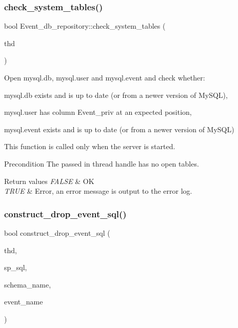 \subsubsection{\texorpdfstring{check\+\_\+system\+\_\+tables()}{check\_system\_tables()}}
{\footnotesize\ttfamily bool Event\+\_\+db\+\_\+repository\+::check\+\_\+system\+\_\+tables (\begin{DoxyParamCaption}\item[{T\+HD $\ast$}]{thd }\end{DoxyParamCaption})\hspace{0.3cm}{\ttfamily [static]}}

Open mysql.\+db, mysql.\+user and mysql.\+event and check whether\+:
\begin{DoxyItemize}
\item mysql.\+db exists and is up to date (or from a newer version of My\+S\+QL),
\item mysql.\+user has column Event\+\_\+priv at an expected position,
\item mysql.\+event exists and is up to date (or from a newer version of My\+S\+QL)
\end{DoxyItemize}

This function is called only when the server is started. \begin{DoxyPrecond}{Precondition}
The passed in thread handle has no open tables.
\end{DoxyPrecond}

\begin{DoxyRetVals}{Return values}
{\em F\+A\+L\+SE} & OK \\
\hline
{\em T\+R\+UE} & Error, an error message is output to the error log. \\
\hline
\end{DoxyRetVals}
\mbox{\label{group__Event__Scheduler_ga952e506d8f76739d416da0fb7169fac3}} 
\subsubsection{\texorpdfstring{construct\+\_\+drop\+\_\+event\+\_\+sql()}{construct\_drop\_event\_sql()}}
{\footnotesize\ttfamily bool construct\+\_\+drop\+\_\+event\+\_\+sql (\begin{DoxyParamCaption}\item[{T\+HD $\ast$}]{thd,  }\item[{String $\ast$}]{sp\+\_\+sql,  }\item[{const L\+E\+X\+\_\+\+S\+T\+R\+I\+NG \&}]{schema\+\_\+name,  }\item[{const L\+E\+X\+\_\+\+S\+T\+R\+I\+NG \&}]{event\+\_\+name }\end{DoxyParamCaption})}

